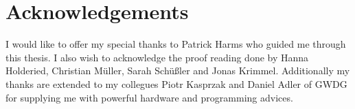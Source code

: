\documentclass[
    pagesize,%
    a4paper,%
    headsepline,%
    footsepline,%
    headinclude,%
    footinclude,%
    bibtotoc,%
    cleardoubleplain,%
    tablecaptionabove,%
]{scrreprt}
\begin{document}
%

%

\clearpage



\newpage
\chapter*{Acknowledgements}
I would like to offer my special thanks to Patrick Harms who guided me through this thesis.
I also wish to acknowledge the proof reading done by Hanna Holderied, Christian M\"uller, Sarah Sch\"u\ss{}ler and Jonas Krimmel.
Additionally my thanks are extended to my collegues Piotr Kasprzak and Daniel Adler of GWDG for supplying me with powerful hardware and programming advices.
\end{document}
